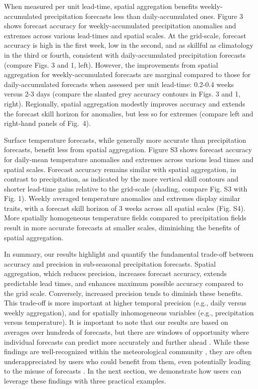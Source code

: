 \documentclass[preprint,12pt,authoryear]{elsarticle}
\begin{document}
When measured per unit lead-time, spatial aggregation benefits weekly-accumulated precipitation forecasts less than daily-accumulated ones. Figure 3 shows forecast accuracy for weekly-accumulated precipitation anomalies and extremes across various lead-times and spatial scales. At the grid-scale, forecast accuracy is high in the first week, low in the second, and as skillful as climatology in the third or fourth, consistent with daily-accumulated precipitation forecasts (compare Figs. 3 and 1, left). However, the improvements from spatial aggregation for weekly-accumulated forecasts are marginal compared to those for daily-accumulated forecasts when assessed per unit lead-time: 0.2-0.4 weeks versus 2-3 days (compare the slanted grey accuracy contours in Figs. 3 and 1, right). Regionally, spatial aggregation modestly improves accuracy and extends the forecast skill horizon for anomalies, but less so for extremes (compare left and right-hand panels of Fig.~4). 




Surface temperature forecasts, while generally more accurate than precipitation forecasts, benefit less from spatial aggregation. Figure S3 shows forecast accuracy for daily-mean temperature anomalies and extremes across various lead times and spatial scales. Forecast accuracy remains similar with spatial aggregation, in contrast to precipitation, as indicated by the more vertical skill contours and shorter lead-time gains relative to the grid-scale (shading, compare Fig. S3 with Fig. 1). Weekly averaged temperature anomalies and extremes display similar traits, with a forecast skill horizon of 3 weeks across all spatial scales (Fig. S4). More spatially homogeneous temperature fields compared to precipitation fields result in more accurate forecasts at smaller scales, diminishing the benefits of spatial aggregation. 



In summary, our results highlight and quantify the fundamental trade-off between accuracy and precision in sub-seasonal precipitation forecasts. Spatial aggregation, which reduces precision, increases forecast accuracy, extends predictable lead times, and enhances maximum possible accuracy compared to the grid scale. Conversely, increased precision tends to diminish these benefits. This trade-off is more important at higher temporal precision (e.g., daily versus weekly aggregation), and for spatially inhomogeneous variables (e.g., precipitation versus temperature). It is important to note that our results are based on averages over hundreds of forecasts, but there are windows of opportunity where individual forecasts can predict more accurately and further ahead \citep{Mariotti2020}. While these findings are well-recognized within the meteorological community \citep{BuizzLeutbecher2015, TothBuizza2019}, they are often underappreciated by users who could benefit from them, even potentially leading to the misuse of forecasts \citep{Nissan2019,Fiedler2021}. In the next section, we demonstrate how users can leverage these findings with three practical examples.
\end{document}
